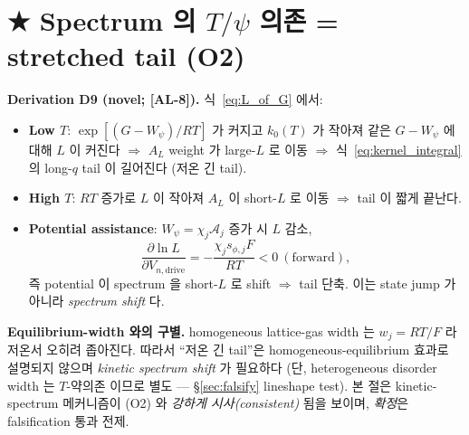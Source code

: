 \documentclass[11pt,a4paper]{article}
\newcommand{\dimedrive}{\mathrm{drive}}
\newcommand{\AL}[1]{\textsf{[AL-#1]}}
\begin{document}
\section{★ Spectrum 의 $T/\psi$ 의존 = stretched tail (O2)}\label{sec:tailT}
\textbf{Derivation D9 (novel; \AL{8}).} 식~\eqref{eq:L_of_G} 에서:
\begin{itemize}
\item \textbf{Low $T$}: $\exp[(G-W_\psi)/RT]$ 가 커지고 $k_0(T)$ 가 작아져 같은 $G-W_\psi$
  에 대해 $L$ 이 커진다 $\Rightarrow$ $A_L$ weight 가 large-$L$ 로 이동 $\Rightarrow$
  식~\eqref{eq:kernel_integral} 의 long-$q$ tail 이 길어진다 (저온 긴 tail).
\item \textbf{High $T$}: $RT$ 증가로 $L$ 이 작아져 $A_L$ 이 short-$L$ 로 이동 $\Rightarrow$
  tail 이 짧게 끝난다.
\item \textbf{Potential assistance}: $W_\psi=\chi_j\mathcal A_j$ 증가 시 $L$ 감소,
  \begin{equation}
  \frac{\partial\ln L}{\partial V_{n,\dimedrive}}=-\frac{\chi_j s_{\phi,j}F}{RT}<0\ (\text{forward}),
  \label{eq:psi_shift}
  \end{equation}
  즉 potential 이 spectrum 을 short-$L$ 로 shift $\Rightarrow$ tail 단축. 이는 state jump
  가 아니라 \emph{spectrum shift} 다.
\end{itemize}
\textbf{Equilibrium-width 와의 구별.} homogeneous lattice-gas width 는 $w_j=RT/F$ 라 저온서
오히려 좁아진다. 따라서 ``저온 긴 tail''은 homogeneous-equilibrium 효과로 설명되지 않으며
\emph{kinetic spectrum shift} 가 필요하다 (단, heterogeneous disorder width 는 $T$-약의존
이므로 별도 — \S\ref{sec:falsify} lineshape test). 본 절은 kinetic-spectrum 메커니즘이
(O2) 와 \emph{강하게 시사(consistent)} 됨을 보이며, \emph{확정}은 falsification 통과 전제.

\end{document}
